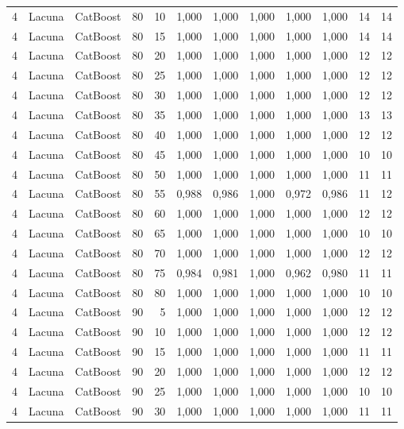 \begin{longtable}{@{}rllrrrrrrrrr@{}}
4 & Lacuna & CatBoost & 80 & 10 & 1,000 & 1,000 & 1,000 & 1,000 & 1,000 & 14 & 14 \\
4 & Lacuna & CatBoost & 80 & 15 & 1,000 & 1,000 & 1,000 & 1,000 & 1,000 & 14 & 14 \\
4 & Lacuna & CatBoost & 80 & 20 & 1,000 & 1,000 & 1,000 & 1,000 & 1,000 & 12 & 12 \\
4 & Lacuna & CatBoost & 80 & 25 & 1,000 & 1,000 & 1,000 & 1,000 & 1,000 & 12 & 12 \\
4 & Lacuna & CatBoost & 80 & 30 & 1,000 & 1,000 & 1,000 & 1,000 & 1,000 & 12 & 12 \\
4 & Lacuna & CatBoost & 80 & 35 & 1,000 & 1,000 & 1,000 & 1,000 & 1,000 & 13 & 13 \\
4 & Lacuna & CatBoost & 80 & 40 & 1,000 & 1,000 & 1,000 & 1,000 & 1,000 & 12 & 12 \\
4 & Lacuna & CatBoost & 80 & 45 & 1,000 & 1,000 & 1,000 & 1,000 & 1,000 & 10 & 10 \\
4 & Lacuna & CatBoost & 80 & 50 & 1,000 & 1,000 & 1,000 & 1,000 & 1,000 & 11 & 11 \\
4 & Lacuna & CatBoost & 80 & 55 & 0,988 & 0,986 & 1,000 & 0,972 & 0,986 & 11 & 12 \\
4 & Lacuna & CatBoost & 80 & 60 & 1,000 & 1,000 & 1,000 & 1,000 & 1,000 & 12 & 12 \\
4 & Lacuna & CatBoost & 80 & 65 & 1,000 & 1,000 & 1,000 & 1,000 & 1,000 & 10 & 10 \\
4 & Lacuna & CatBoost & 80 & 70 & 1,000 & 1,000 & 1,000 & 1,000 & 1,000 & 12 & 12 \\
4 & Lacuna & CatBoost & 80 & 75 & 0,984 & 0,981 & 1,000 & 0,962 & 0,980 & 11 & 11 \\
4 & Lacuna & CatBoost & 80 & 80 & 1,000 & 1,000 & 1,000 & 1,000 & 1,000 & 10 & 10 \\
4 & Lacuna & CatBoost & 90 & 5 & 1,000 & 1,000 & 1,000 & 1,000 & 1,000 & 12 & 12 \\
4 & Lacuna & CatBoost & 90 & 10 & 1,000 & 1,000 & 1,000 & 1,000 & 1,000 & 12 & 12 \\
4 & Lacuna & CatBoost & 90 & 15 & 1,000 & 1,000 & 1,000 & 1,000 & 1,000 & 11 & 11 \\
4 & Lacuna & CatBoost & 90 & 20 & 1,000 & 1,000 & 1,000 & 1,000 & 1,000 & 12 & 12 \\
4 & Lacuna & CatBoost & 90 & 25 & 1,000 & 1,000 & 1,000 & 1,000 & 1,000 & 10 & 10 \\
4 & Lacuna & CatBoost & 90 & 30 & 1,000 & 1,000 & 1,000 & 1,000 & 1,000 & 11 & 11 \\

\end{longtable}
